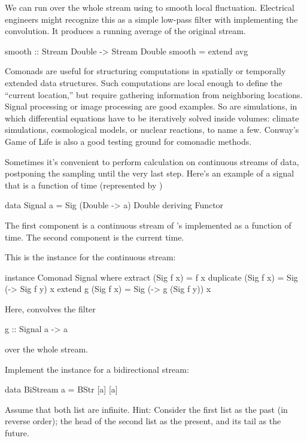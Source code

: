 \documentclass[DaoFP]{subfiles}
\begin{document}
We can run  over the whole stream using  to smooth local fluctuation. Electrical engineers might recognize this as a simple low-pass filter with  implementing the convolution. It produces a running average of the original stream. 
\begin{haskell}
smooth :: Stream Double -> Stream Double
smooth = extend avg
\end{haskell}


Comonads are useful for structuring computations in spatially or temporally extended data structures. Such computations are local enough to define the ``current location,'' but require gathering information from neighboring locations. Signal processing or image processing are good examples. So are simulations, in which differential equations have to be iteratively solved inside volumes: climate simulations, cosmological models, or nuclear reactions, to name a few. Conway's Game of Life is also a good testing ground for comonadic methods.

Sometimes it's convenient to perform calculation on continuous streams of data, postponing the sampling until the very last step. Here's an example of a signal that is a function of time (represented by )
\begin{haskell}
data Signal a = Sig (Double -> a) Double
    deriving Functor
\end{haskell}
The first component is a continuous stream of 's implemented as a function of time. The second component is the current time.

This is the  instance for the continuous stream:
\begin{haskell}
instance Comonad Signal where
  extract (Sig f x) = f x
  duplicate (Sig f x) = Sig (\y -> Sig f y) x
  extend g (Sig f x) = Sig (\y -> g (Sig f y)) x
\end{haskell}
Here,  convolves the filter 
\begin{haskell}
g :: Signal a -> a
\end{haskell}
over the whole stream. 

\begin{exercise}
Implement the  instance for a bidirectional stream:
\begin{haskell}
data BiStream a = BStr [a] [a]
\end{haskell}
Assume that both list are infinite. Hint: Consider the first list as the past (in reverse order); the head of the second list as the present, and its tail as the future.
\end{exercise}
\end{document}
